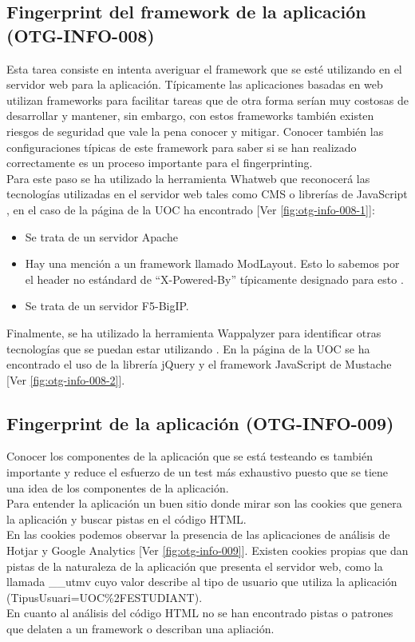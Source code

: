 \documentclass[10pt,a4paper]{article}
\begin{document}
\subsection{Fingerprint del framework de la aplicación (OTG-INFO-008)}
Esta tarea consiste en intenta averiguar el framework que se esté utilizando en el servidor web para la aplicación. Típicamente las aplicaciones basadas en web utilizan frameworks para facilitar tareas que de otra forma serían muy costosas de desarrollar y mantener, sin embargo, con estos frameworks también existen riesgos de seguridad que vale la pena conocer y mitigar. Conocer también las configuraciones típicas de este framework para saber si se han realizado correctamente es un proceso importante para el fingerprinting.\\
Para este paso se ha utilizado la herramienta Whatweb que reconocerá las tecnologías utilizadas en el servidor web tales como CMS o librerías de JavaScript \cite{whatweb}, en el caso de la página de la UOC ha encontrado [Ver \ref{fig:otg-info-008-1}]:
\begin{itemize}
\item Se trata de un servidor Apache
\item Hay una mención a un framework llamado ModLayout. Esto lo sabemos por el header no estándard de ``X-Powered-By'' típicamente designado para esto \cite{x-pow}.
\item Se trata de un servidor F5-BigIP.
\end{itemize}
Finalmente, se ha utilizado la herramienta Wappalyzer para identificar otras tecnologías que se puedan estar utilizando \cite{wappalyzer}. En la página de la UOC se ha encontrado el uso de la librería jQuery y el framework JavaScript de Mustache [Ver \ref{fig:otg-info-008-2}].

\subsection{Fingerprint de la aplicación (OTG-INFO-009)}
Conocer los componentes de la aplicación que se está testeando es también importante y reduce el esfuerzo de un test más exhaustivo puesto que se tiene una idea de los componentes de la aplicación.\\
Para entender la aplicación un buen sitio donde mirar son las cookies que genera la aplicación y buscar pistas en el código HTML.\\
En las cookies podemos observar la presencia de las aplicaciones de análisis de Hotjar y Google Analytics \cite{gaq} [Ver \ref{fig:otg-info-009}]. Existen cookies propias que dan pistas de la naturaleza de la aplicación que presenta el servidor web, como la llamada \_\_utmv cuyo valor describe al tipo de usuario que utiliza la aplicación (TipusUsuari=UOC\%2FESTUDIANT).\\
En cuanto al análisis del código HTML no se han encontrado pistas o patrones que delaten a un framework o describan una apliación.\\
\end{document}
